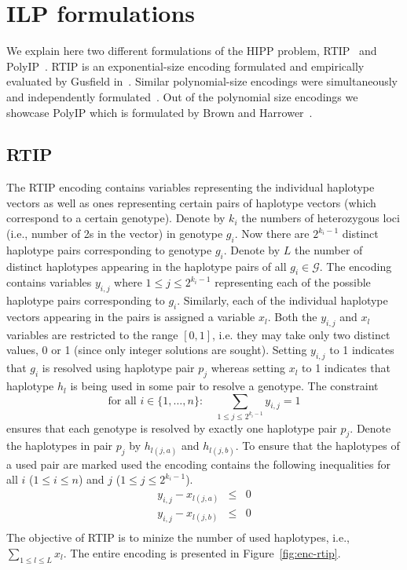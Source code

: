 \documentclass[12pt,a4paper]{article}
\begin{document}
\section{ILP formulations}
\label{sec:ilp-hipp}
We explain here two different formulations of the HIPP problem, RTIP~\cite{DBLP:conf/cpm/Gusfield03} and PolyIP~\cite{DBLP:journals/tcbb/BrownH06}.
RTIP is an exponential-size encoding formulated and empirically evaluated by Gusfield in~\cite{DBLP:conf/cpm/Gusfield03}.
Similar polynomial-size encodings were simultaneously and independently formulated~\cite{DBLP:journals/tcbb/BrownH06, DBLP:conf/recomb/HalldorssonBELYI02, DBLP:journals/informs/LanciaPR04}.
Out of the polynomial size encodings we showcase PolyIP which is formulated by Brown and Harrower~\cite{DBLP:journals/tcbb/BrownH06}.

\subsection{RTIP}

The RTIP encoding contains variables representing the individual haplotype vectors as well as ones representing certain pairs of haplotype vectors (which correspond to a certain genotype).
Denote by $k_i$ the numbers of heterozygous loci (i.e., number of 2s in the vector) in genotype $g_i$.
Now there are $2^{k_i-1}$ distinct haplotype pairs corresponding to genotype $g_i$.
Denote by $L$ the number of distinct haplotypes appearing in the haplotype pairs of all $g_i\in\mathcal{G}$.
The encoding contains variables $y_{i,j}$ where $1\leq j \leq 2^{k_i-1}$ representing each of the possible haplotype pairs corresponding to $g_i$.
Similarly, each of the individual haplotype vectors appearing in the pairs is assigned a variable $x_l$.
Both the $y_{i,j}$ and $x_l$ variables are restricted to the range $[0,1]$, i.e. they may take only two distinct values, 0 or 1 (since only integer solutions are sought).
Setting $y_{i,j}$ to 1 indicates that $g_i$ is resolved using haplotype pair $p_j$ whereas 
setting $x_l$ to 1 indicates that haplotype $h_l$ is being used in some pair to resolve a genotype.
The constraint
$$ \text{for all  }i\in\{1,\dots , n\}:\quad \sum_{1\leq j \leq 2^{k_i-1}} y_{i,j} = 1 $$
ensures that each genotype is resolved by exactly one haplotype pair $p_j$.
Denote the haplotypes in pair $p_j$ by $h_{l(j,a)}$ and $h_{l(j,b)}$.
To ensure that the haplotypes of a used pair are marked used the encoding contains the following inequalities for all $i$ ($1\leq i \leq n$) and $j$ ($1\leq j \leq 2^{k_i-1}$).
\begin{eqnarray*}
y_{i,j} - x_{l(j,a)} & \leq & 0 \\
y_{i,j} - x_{l(j,b)} & \leq & 0 \\
\end{eqnarray*}
The objective of RTIP is to minize the number of used haplotypes, i.e., $\sum_{1\leq l \leq L} x_l$.
The entire encoding is presented in Figure~\ref{fig:enc-rtip}.
\end{document}
